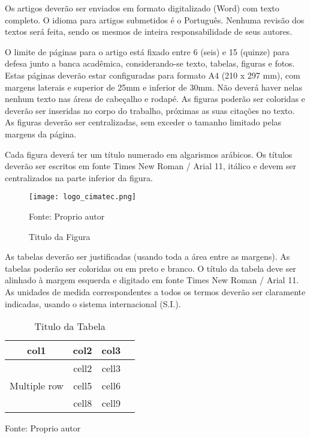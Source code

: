 \documentclass[../main.tex]{subfiles}
\begin{document}
  Os artigos deverão ser enviados em formato digitalizado (Word) com texto  completo.  O  idioma  para  artigos  submetidos  é  o  Português.  Nenhuma  revisão  dos  textos  será  feita,  sendo  os  mesmos  de  inteira  responsabilidade  de  seus  autores.
      
  O limite de páginas para o artigo está fixado entre 6 (seis) e 15 (quinze)  para defesa junto a banca acadêmica, considerando-se texto, tabelas, figuras e  fotos.  Estas  páginas  deverão  estar  configuradas  para  formato  A4  (210  x  297  mm), com margens laterais e superior de 25mm e inferior de 30mm. Não deverá  haver nelas nenhum texto nas áreas de cabeçalho e rodapé. As figuras poderão  ser  coloridas  e  deverão  ser  inseridas  no  corpo  do  trabalho,  próximas  as  suas  citações no texto. As figuras deverão ser centralizadas, sem exceder o tamanho  limitado pelas margens da página.

  Cada  figura  deverá  ter  um  título  numerado  em  algarismos  arábicos.  Os  títulos deverão ser escritos em fonte Times New Roman / Arial 11, itálico e devem  ser centralizados na parte inferior da figura. 

  \begin{figure}[h]
    \centering
    \caption{Titulo da Figura}
    \texttt{[image: logo\_cimatec.png]}
    
    Fonte: Proprio autor
    \label{fig:fig1}
  \end{figure}

  As tabelas deverão ser justificadas (usando toda a área entre as  margens).  As  tabelas  poderão  ser  coloridas  ou  em  preto  e  branco.  O  título  da  tabela  deve  ser  alinhado  à  margem  esquerda  e  digitado  em  fonte  Times  New  Roman  /  Arial  11.  As  unidades  de  medida  correspondentes  a  todos  os  termos  deverão ser claramente indicadas, usando o sistema internacional (S.I.). 

  \begin{table}
    \caption{Titulo da Tabela}
    \centering
    \begin{tabular}{ |c|c|c|c| } 
      \hline
      col1 & col2 & col3 \\
      \hline
      \multirow{3}{4em}{Multiple row} & cell2 & cell3 \\ 
      & cell5 & cell6 \\ 
      & cell8 & cell9 \\ 
      \hline
      \end{tabular}
    
      Fonte: Proprio autor
    \label{tab:table-name}
  \end{table}
\end{document}

